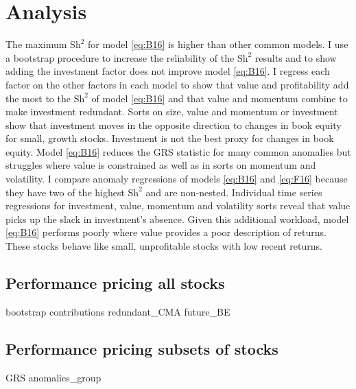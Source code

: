 
\section*{Analysis}

The maximum $\text{Sh}^2$ for model \ref{eq:B16} is higher than other common
models. I use a bootstrap procedure to increase the reliability of the
$\text{Sh}^2$ results and to show adding the investment factor does not improve
model \ref{eq:B16}. I regress each factor on the other factors
in each model to show that value and profitability add the most to the
$\text{Sh}^2$ of model \ref{eq:B16} and that value and momentum combine to make
investment redundant. Sorts on size, value and momentum or investment show that
investment moves in the opposite direction to changes in book equity for small,
growth stocks. Investment is not the best proxy for changes in book equity.
Model \ref{eq:B16} reduces the GRS statistic for many common anomalies but
struggles where value is constrained as well as in sorts on momentum and
volatility. I compare anomaly regressions of models \ref{eq:B16} and
\ref{eq:F16} because they have two of the highest $\text{Sh}^2$ and are
non-nested.
Individual time series regressions for investment, value, momentum and
volatility sorts reveal that value picks up the slack in investment's absence.
Given this additional workload, model \ref{eq:B16} performs poorly where value
provides a poor description of returns. These stocks behave like small,
unprofitable stocks with low recent returns.

\subsection*{Performance pricing all stocks}

{bootstrap}
{contributions}
{redundant_CMA}
{future_BE}

\subsection*{Performance pricing subsets of stocks}

{GRS}
{anomalies_group}
